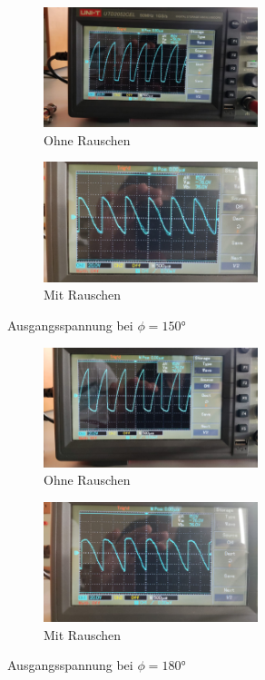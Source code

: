 \begin{figure}
    \begin{subfigure}{0.48 \textwidth}
        \centering
        \includegraphics[height = 3.5cm]{data_scripts/pics/150o.jpeg}
        \caption{Ohne Rauschen}
    \end{subfigure}
    \hfill
    \begin{subfigure}{0.48 \textwidth}
            \centering
            \includegraphics[height = 3.5cm]{data_scripts/pics/150m.jpeg}
            \caption{Mit Rauschen}
    \end{subfigure}
    \caption{Ausgangsspannung bei $\phi = \ang{150;;}$}
\end{figure}
\begin{figure}
    \begin{subfigure}{0.48 \textwidth}
        \centering
        \includegraphics[height = 3.5cm]{data_scripts/pics/180o.jpeg}
        \caption{Ohne Rauschen}
    \end{subfigure}
    \hfill
    \begin{subfigure}{0.48 \textwidth}
            \centering
            \includegraphics[height = 3.5cm]{data_scripts/pics/180m.jpeg}
            \caption{Mit Rauschen}
    \end{subfigure}
    \caption{Ausgangsspannung bei $\phi = \ang{180;;}$}
\end{figure}
